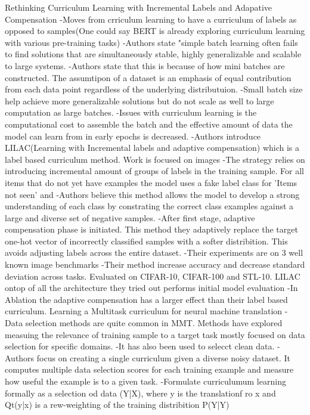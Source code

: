 Rethinking Curriculum Learning with Incremental Labels and Adapative Compensation
-Moves from crriculum learning to have a curriculum of labels as opposed to samples(One could say BERT is already exploring curriculum learning with various pre-training tasks)
-Authors state "simple batch learning often fails to find solutions that are simultaneously stable, highly generalizable and scalable to large systems. 
-Authors state that this is because of how mini batches are constructed. The assumtipon of a dataset is an emphasis of equal contribution from each data point regardless of the underlying distributuion.
-Small batch size help achieve more generalizable solutions but do not scale as well to large computation as large batches. 
-Issues with curriculum learning is the computational cost to assemble the batch and the effective amount of data the model can learn from in early epochs is decreased.
-Authors introduce LILAC(Learning with Incremental labels and adaptive compensation) which is a label based curriculum method. Work is focused on images
-The strategy relies on introducing incremental amount of groups of labels in the training sample. For all items that do not yet have examples the model uses a fake label class for 'Items not seen' and
-Authors believe this method allows the model to develop a strong understanding of each class by constrating the correct class examples against a large and diverse set of negative samples.
-After first stage, adaptive compensation phase is initiated. This method they adaptively replace the target one-hot vector of incorrectly classified samples with a softer distribition. This avoids adjusting labels across the entire dataset. 
-Their experiments are on 3 well known image benchmarks
-Their method increase accuracy and decrease standard deviation across tasks. Evaluated on CIFAR-10, CIFAR-100 and STL-10. LILAC ontop of all the architecture they tried out performs initial model evaluation
-In Ablation the adaptive compensation has a larger effect than their label based curriculum.
Learning a Multitask curriculum for neural machine translation
-Data selection methods are quite common in MMT. Methods have explored measuing the relevance of training sample to a target task mostly focused on data selection for specific domains. 
-It has also been used to selecct clean data. 
-Authors focus on creating a single curriculum given a diverse noisy dataset. It computes multiple data selection scores for each training example and measure how useful the example is to a given task. 
-Formulate curriculumum learning formally as a selection od data (Y|X), where y is the translationf ro x and Qt(y|x) is a rew-weighting of the training distribition P(Y|Y)
